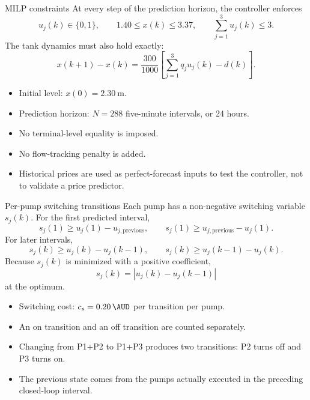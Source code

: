 \documentclass[t,12pt]{beamer}
\begin{document}
\begin{frame}{MILP constraints}
At every step of the prediction horizon, the controller enforces
\[
  u_j(k)\in\{0,1\},\qquad
  1.40\leq x(k)\leq3.37,\qquad
  \sum_{j=1}^{3}u_j(k)\leq3.
\]
The tank dynamics must also hold exactly:
\[
  x(k+1)-x(k)=\frac{300}{1000}\left[
  \sum_{j=1}^{3}q_j u_j(k)-d(k)\right].
\]

\begin{itemize}
  \item Initial level: $x(0)=\SI{2.30}{\metre}$.
  \item Prediction horizon: $N=288$ five-minute intervals, or 24 hours.
  \item No terminal-level equality is imposed.
  \item No flow-tracking penalty is added.
  \item Historical prices are used as perfect-forecast inputs to test the
        controller, not to validate a price predictor.
\end{itemize}
\end{frame}

\begin{frame}{Per-pump switching transitions}
Each pump has a non-negative switching variable $s_j(k)$.  For the first
predicted interval,
\[
  s_j(1)\geq u_j(1)-u_{j,\mathrm{previous}},\qquad
  s_j(1)\geq u_{j,\mathrm{previous}}-u_j(1).
\]
For later intervals,
\[
  s_j(k)\geq u_j(k)-u_j(k-1),\qquad
  s_j(k)\geq u_j(k-1)-u_j(k).
\]
Because $s_j(k)$ is minimized with a positive coefficient,
\[
  s_j(k)=\left|u_j(k)-u_j(k-1)\right|
\]
at the optimum.

\begin{itemize}
  \item Switching cost: $c_s=\SI{0.20}{\AUD}$ per transition per pump.
  \item An on transition and an off transition are counted separately.
  \item Changing from P1+P2 to P1+P3 produces two transitions:
        P2 turns off and P3 turns on.
  \item The previous state comes from the pumps actually executed in the
        preceding closed-loop interval.
\end{itemize}
\end{frame}
\end{document}
